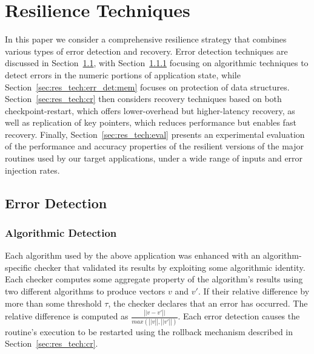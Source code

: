 \documentclass{sig-alternate}
\newcommand{\sui}[1]{%
  \textcolor{green}{SC-#1}
}
\begin{document}
\section{Resilience Techniques}
\label{sec:res_tech}

In this paper we consider a comprehensive resilience strategy that combines various types of error detection and recovery.
Error detection techniques are discussed in Section~\ref{sec:res_tech:err_det}, with Section~\ref{sec:res_tech:err_det:algo} focusing on algorithmic techniques to detect errors in the numeric portions of application state, while Section~\ref{sec:res_tech:err_det:mem} focuses on protection of data structures.
Section~\ref{sec:res_tech:cr} then considers recovery techniques based on both checkpoint-restart, which offers lower-overhead but higher-latency recovery, as well as replication of key pointers, which reduces performance but enables fast recovery.
Finally, Section~\ref{sec:res_tech:eval} presents an experimental evaluation of the performance and accuracy properties of the resilient versions of the major routines used by our target applications, under a wide range of inputs and error injection rates.

\subsection{Error Detection}
\label{sec:res_tech:err_det}

\vspace{-5pt}
\subsubsection{Algorithmic Detection}
\label{sec:res_tech:err_det:algo}


Each algorithm used by the above application was enhanced with an algorithm-specific checker that validated its results by exploiting some algorithmic identity.
Each checker computes some aggregate property of the algorithm's results using two different algorithms to produce vectors $v$ and $v'$.
If their relative difference by more than some threshold $\tau$, the checker declares that an error has occurred.
The relative difference is computed as $\frac{\left|| v-v' \right||}{max(\left||v\right||, \left||v'\right||)}$.
Each error detection causes the routine's execution to be restarted using the rollback mechanism described in Section~\ref{sec:res_tech:cr}.
\end{document}
